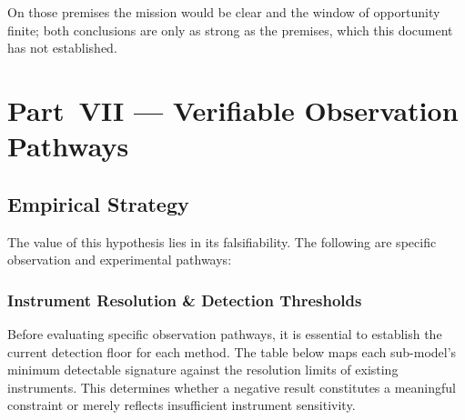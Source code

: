 \documentclass[aps,prd,twocolumn,superscriptaddress,nofootinbib]{revtex4-2}
\begin{document}
On those premises the mission would be clear and the window of opportunity finite; both conclusions are only as strong as the premises, which this document has not established.


\section{Part~VII --- Verifiable Observation Pathways}\label{sec:part7}

\subsection{Empirical Strategy}\label{sec:empirical}

The value of this hypothesis lies in its falsifiability. The following are specific observation and experimental pathways:

\subsubsection{Instrument Resolution \& Detection Thresholds}\label{sec:instrument-thresholds}

Before evaluating specific observation pathways, it is essential to establish the current detection floor for each method. The table below maps each sub-model's minimum detectable signature against the resolution limits of existing instruments. This determines whether a negative result constitutes a meaningful constraint or merely reflects insufficient instrument sensitivity.
\end{document}
